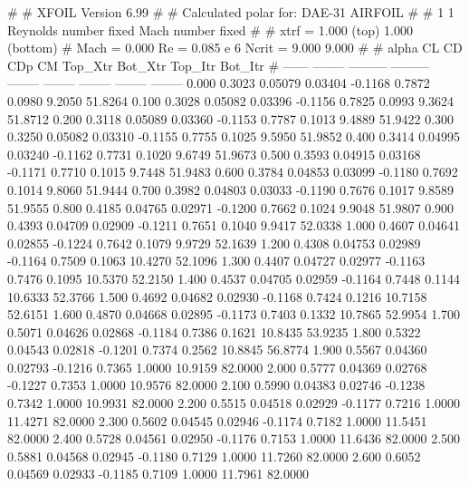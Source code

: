 #  
#       XFOIL         Version 6.99
#  
# Calculated polar for: DAE-31 AIRFOIL                                  
#  
# 1 1 Reynolds number fixed          Mach number fixed         
#  
# xtrf =   1.000 (top)        1.000 (bottom)  
# Mach =   0.000     Re =     0.085 e 6     Ncrit =   9.000  9.000
#  
#   alpha    CL        CD       CDp       CM     Top_Xtr  Bot_Xtr  Top_Itr  Bot_Itr
#  ------ -------- --------- --------- -------- -------- -------- -------- --------
   0.000   0.3023   0.05079   0.03404  -0.1168   0.7872   0.0980   9.2050  51.8264
   0.100   0.3028   0.05082   0.03396  -0.1156   0.7825   0.0993   9.3624  51.8712
   0.200   0.3118   0.05089   0.03360  -0.1153   0.7787   0.1013   9.4889  51.9422
   0.300   0.3250   0.05082   0.03310  -0.1155   0.7755   0.1025   9.5950  51.9852
   0.400   0.3414   0.04995   0.03240  -0.1162   0.7731   0.1020   9.6749  51.9673
   0.500   0.3593   0.04915   0.03168  -0.1171   0.7710   0.1015   9.7448  51.9483
   0.600   0.3784   0.04853   0.03099  -0.1180   0.7692   0.1014   9.8060  51.9444
   0.700   0.3982   0.04803   0.03033  -0.1190   0.7676   0.1017   9.8589  51.9555
   0.800   0.4185   0.04765   0.02971  -0.1200   0.7662   0.1024   9.9048  51.9807
   0.900   0.4393   0.04709   0.02909  -0.1211   0.7651   0.1040   9.9417  52.0338
   1.000   0.4607   0.04641   0.02855  -0.1224   0.7642   0.1079   9.9729  52.1639
   1.200   0.4308   0.04753   0.02989  -0.1164   0.7509   0.1063  10.4270  52.1096
   1.300   0.4407   0.04727   0.02977  -0.1163   0.7476   0.1095  10.5370  52.2150
   1.400   0.4537   0.04705   0.02959  -0.1164   0.7448   0.1144  10.6333  52.3766
   1.500   0.4692   0.04682   0.02930  -0.1168   0.7424   0.1216  10.7158  52.6151
   1.600   0.4870   0.04668   0.02895  -0.1173   0.7403   0.1332  10.7865  52.9954
   1.700   0.5071   0.04626   0.02868  -0.1184   0.7386   0.1621  10.8435  53.9235
   1.800   0.5322   0.04543   0.02818  -0.1201   0.7374   0.2562  10.8845  56.8774
   1.900   0.5567   0.04360   0.02793  -0.1216   0.7365   1.0000  10.9159  82.0000
   2.000   0.5777   0.04369   0.02768  -0.1227   0.7353   1.0000  10.9576  82.0000
   2.100   0.5990   0.04383   0.02746  -0.1238   0.7342   1.0000  10.9931  82.0000
   2.200   0.5515   0.04518   0.02929  -0.1177   0.7216   1.0000  11.4271  82.0000
   2.300   0.5602   0.04545   0.02946  -0.1174   0.7182   1.0000  11.5451  82.0000
   2.400   0.5728   0.04561   0.02950  -0.1176   0.7153   1.0000  11.6436  82.0000
   2.500   0.5881   0.04568   0.02945  -0.1180   0.7129   1.0000  11.7260  82.0000
   2.600   0.6052   0.04569   0.02933  -0.1185   0.7109   1.0000  11.7961  82.0000
